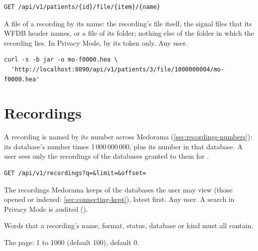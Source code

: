 \begin{lstlisting}[style=signature]
GET /api/v1/patients/{id}/file/{item}/{name}
\end{lstlisting}
A file of a recording by its name: the recording's file itself, the signal files that its WFDB
header names, or a file of its folder; nothing else of the folder in which the recording lies. In Privacy Mode, by its token only. Any user.
\begin{lstlisting}[style=shell]
curl -s -b jar -o mo-f0000.hea \
  'http://localhost:8090/api/v1/patients/3/file/1000000004/mo-f0000.hea'
\end{lstlisting}

\section{Recordings}
\label{sec:http-api-recordings}

A recording is named by its number across Medorama (\cref{sec:recordings-numbers}): its
database's number times 1\,000\,000\,000, plus its number in that database. A user sees only the
recordings of the databases granted to them for \code{view}.

\begin{lstlisting}[style=signature]
GET /api/v1/recordings?q=&limit=&offset=
\end{lstlisting}
The recordings Medorama keeps of the databases the user may view (those opened or indexed:
\cref{sec:connecting-kept}), latest first. Any user. A search in Privacy
Mode is audited (\code{privacy\_search}).
\begin{params}
\item[q] Words that a recording's name, format, status, database or kind must all contain.
\item[limit, offset] The page: \code{limit} 1 to 1000 (default 100), \code{offset} default 0.
\end{params}

